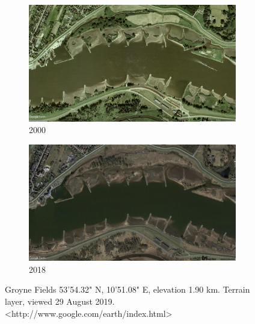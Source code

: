 \documentclass[../main.tex]{subfiles}
\begin{document}
\begin{figure}[!ht]
\centering
\begin{subfigure}{0.49\textwidth}
  \centering
  \includegraphics[width=0.9\linewidth]{../images/introduction/sat2000.jpg}
  \caption{2000}
  \label{fig:sat2000}
\end{subfigure}%
\begin{subfigure}{.49\textwidth}
  \centering
  \includegraphics[width=0.9\linewidth]{../images/introduction/sat2018.jpg}
  \caption{2018}
  \label{fig:sat2018}
\end{subfigure}
\caption{Groyne Fields 53'54.32" N,  10'51.08" E, elevation 1.90 km. Terrain layer, viewed 29 August 2019. <http://www.google.com/earth/index.html>}
\label{fig:satelliteImage}
\end{figure}
\end{document}
